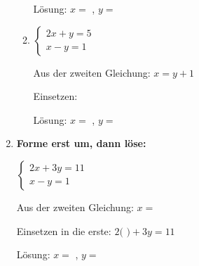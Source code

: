 \begin{enumerate}[label=\arabic*., resume]
\begin{enumerate}[label=\alph*)]
        Lösung: $x =$ \underline{\hspace{1cm}}, $y =$ \underline{\hspace{1cm}}

        \vspace{0.5cm}
        \item $\begin{cases} 2x + y = 5 \\ x - y = 1 \end{cases}$

        Aus der zweiten Gleichung: $x = y + 1$

        Einsetzen: \underline{\hspace{8cm}}

        Lösung: $x =$ \underline{\hspace{1cm}}, $y =$ \underline{\hspace{1cm}}
    \end{enumerate}

    \vspace{1cm}

    \item \textbf{Forme erst um, dann löse:}
    \vspace{0.5cm}

    $\begin{cases} 2x + 3y = 11 \\ x - y = 1 \end{cases}$

    Aus der zweiten Gleichung: $x =$ \underline{\hspace{2cm}}

    Einsetzen in die erste: $2($ \underline{\hspace{1.5cm}} $) + 3y = 11$

    \underline{\hspace{8cm}}

    Lösung: $x =$ \underline{\hspace{1cm}}, $y =$ \underline{\hspace{1cm}}

\end{enumerate}